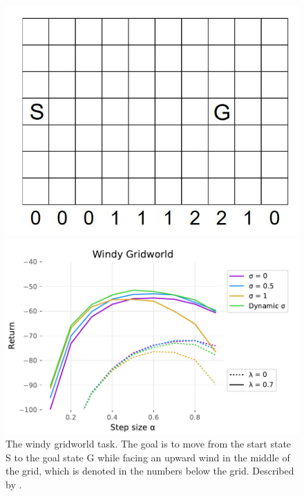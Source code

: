 \documentclass{article} %
\begin{document}
\begin{figure}
\centering
\begin{minipage}[b]{.35\textwidth}
  \includegraphics[width = \textwidth]{windy_gridworld}
\end{minipage} \hspace{0.5cm}
\begin{minipage}[b]{.6\textwidth}
  \includegraphics[width = \textwidth]{windygridworld_alpha.pdf}
\end{minipage}
\begin{minipage}[t]{.35\textwidth}
  \caption{The windy gridworld task. The goal is to move from the start state S to the goal state G while facing an upward wind in the middle of the grid, which is denoted in the numbers below the grid. Described by \cite{sutton1998}.}

\end{minipage}
\end{figure}
\end{document}

